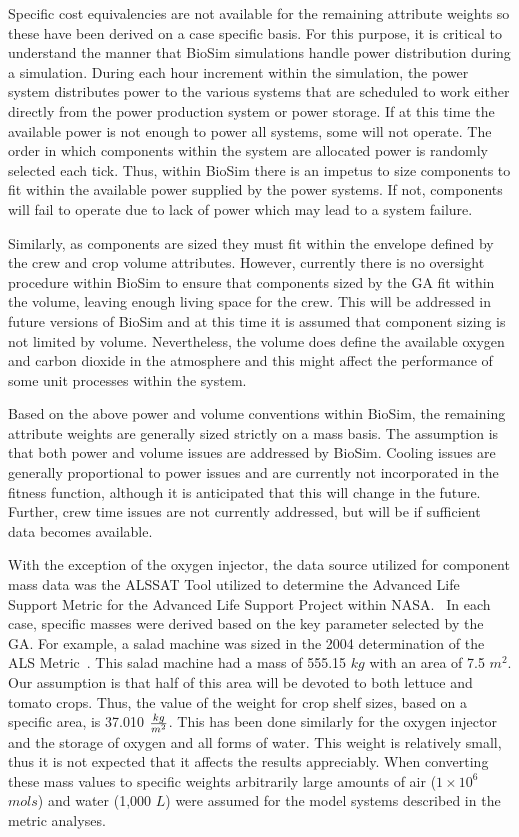 \documentclass[submit]{aiaa}
\begin{document}
Specific cost equivalencies are not available for the remaining
attribute weights so these have been derived on a case specific
basis. For this purpose, it is critical to understand the manner that
BioSim simulations handle power distribution during a
simulation. During each hour increment within the simulation, the
power system distributes power to the various systems that are
scheduled to work either directly from the power production system or
power storage. If at this time the available power is not enough to
power all systems, some will not operate. 
The order in which components within the system are allocated power is randomly selected each tick.
Thus, within BioSim there is an impetus to size components to fit within the available power supplied by the power systems. 
If not, components will fail to operate due to lack of power which may lead to a system failure.

Similarly, as components are sized they must fit within the envelope
defined by the crew and crop volume attributes.  However, currently there is
no oversight procedure within BioSim to ensure that components sized
by the GA fit within the volume, leaving enough living space for the
crew. This will be addressed in future versions of BioSim and at this
time it is assumed that component sizing is not limited by volume.
Nevertheless, the volume does define the available oxygen and carbon dioxide in the atmosphere and this might affect the performance of some unit processes within the system.

Based on the above power and volume conventions within BioSim, the 
remaining attribute weights are generally sized strictly on a mass
basis. The assumption is that both power and volume issues are
addressed by BioSim.  Cooling issues are generally proportional to
power issues and are currently not incorporated in the fitness
function, although it is anticipated that this will change in the
future. Further, crew time issues are not currently addressed, but will be if
sufficient data becomes available. 

With the exception of the oxygen injector, the data source utilized for component mass data was the ALSSAT Tool utilized to determine the Advanced Life Support Metric for the Advanced Life Support Project within NASA.~\cite{metric04, metric03, metric02}
In each case, specific masses were derived based on the key parameter selected by the GA.
For example, a salad machine was sized in the 2004 determination of the ALS Metric~\cite{metric04}.
This salad machine had a mass of 555.15 $kg$ with an area of 7.5 $m^{2}$. 
Our assumption is that half of this area will be devoted to both lettuce and tomato crops.
Thus, the value of the weight for crop shelf sizes, based on a specific area, is 37.010 $kg \over m^{2}$.
This has been done similarly for the oxygen injector and the storage of oxygen and all forms of water.
This weight is relatively small, thus it is not expected that it affects the results appreciably.
When converting these mass values to specific weights arbitrarily large amounts of air ($1\times 10^{6}$ $mols$) and water (1,000 $L$) were assumed for the model systems described in the metric analyses.
\end{document}
